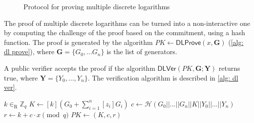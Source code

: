 \begin{figure}[ht]
    \caption{Protocol for proving multiple discrete logarithms}
    \label{fig: protocol for proving multiple discrete logarithms}
\end{figure}

The proof of multiple discrete logarithms can be turned into a non-interactive one by computing the challenge of the proof based on the commitment, using a hash function. The proof is generated by the algorithm $PK \gets \mathsf{DLProve}(x, \boldsymbol{G})$ (\cref{alg: dl prove}), where $\boldsymbol{G} = \{ G_0, ... G_n \}$ is the list of generators.

A public verifier accepts the proof if the algorithm $\mathsf{DLVer}(PK, \boldsymbol{G}; \boldsymbol{Y})$ returns true, where $\boldsymbol{Y} = \{ Y_0, ..., Y_n \}$. The verification algorithm is described in \cref{alg: dl ver}.

\begin{algorithm}[ht]
    \DontPrintSemicolon
    \caption{$\mathsf{DLProve} (x, \boldsymbol{G})$}
    \label{alg: dl prove}
    
    $k \in_\mathrm{R} \mathbb{Z}_q$ \;
    $K \gets [k](G_0 + \sum\limits_{i=1}^n [z_i]G_i)$ \;
    $c \gets \mathcal{H}(G_0 || ... || G_n || K || Y_0 || ... || Y_n)$ \;
    $r \gets k + c \cdot x \pmod q$ \;
    $PK \gets (K, c, r)$ \;
     
\end{algorithm}

